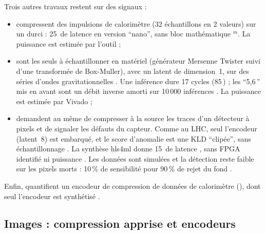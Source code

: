 Trois autres travaux restent sur des signaux :
\begin{itemize}
  \item \citet{arxiv-2602.15751-enabling-low-latency-machine-learning} compressent des
    impulsions de calorimètre (32 échantillons en 2 valeurs) sur un  durci : 25\,
    de latence en version \enquote{nano}, sans bloc mathématique $^{m}$. La
    puissance est estimée par l'outil ;
  \item \citet{2024-que-low-latency-variational-autoencoder-fpgas} sont les seuls à
    échantillonner en matériel (générateur Mersenne Twister suivi d'une transformée de
    Box-Muller), avec un latent de dimension~1, sur des séries d'ondes gravitationnelles
    . Une inférence dure 17 cycles (85\,) ; les \enquote{5,6\,} mis en avant
    sont un débit inverse amorti sur 10\,000 inférences . La puissance est
    estimée par Vivado  ;
  \item \citet{arxiv-2411.01118-variational-autoencoders-source-data-reduction} demandent au
    même  de compresser à la source les traces d'un détecteur à pixels et de signaler les
    défauts du capteur. Comme au LHC, seul l'encodeur (latent~8) est embarqué, et le score
    d'anomalie est une KLD \enquote{clipée}, sans échantillonnage . La synthèse
    hls4ml donne 15\, de latence , sans FPGA identifié ni puissance
    . Les données sont simulées et la détection reste faible sur les
    pixels morts : 10\,\% de sensibilité pour 90\,\% de rejet du fond .
\end{itemize}
Enfin, \citet{2024-campos-end-end-codesign-hessian-aware} quantifient un encodeur de
compression de données de calorimètre (), dont seul l'encodeur est synthétisé
.

\subsection{Images : compression apprise et encodeurs}

